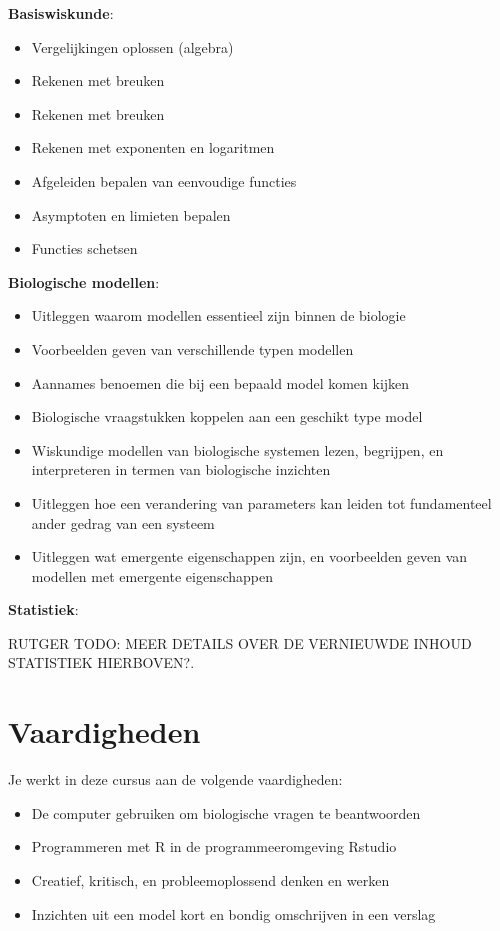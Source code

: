 \documentclass[
  a4paper,
]{scrbook}
\providecommand{\tightlist}{%
  \setlength{\itemsep}{0pt}\setlength{\parskip}{0pt}}\usepackage{longtable,booktabs,array}
\theoremstyle{definition}
\theoremstyle{remark}
\begin{document}
\textbf{Basiswiskunde}:

\begin{itemize}
\tightlist
\item
  Vergelijkingen oplossen (algebra)
\item
  Rekenen met breuken
\item
  Rekenen met breuken
\item
  Rekenen met exponenten en logaritmen
\item
  Afgeleiden bepalen van eenvoudige functies
\item
  Asymptoten en limieten bepalen
\item
  Functies schetsen
\end{itemize}

\textbf{Biologische modellen}:

\begin{itemize}
\tightlist
\item
  Uitleggen waarom modellen essentieel zijn binnen de biologie
\item
  Voorbeelden geven van verschillende typen modellen
\item
  Aannames benoemen die bij een bepaald model komen kijken
\item
  Biologische vraagstukken koppelen aan een geschikt type model
\item
  Wiskundige modellen van biologische systemen lezen, begrijpen, en
  interpreteren in termen van biologische inzichten
\item
  Uitleggen hoe een verandering van parameters kan leiden tot
  fundamenteel ander gedrag van een systeem
\item
  Uitleggen wat emergente eigenschappen zijn, en voorbeelden geven van
  modellen met emergente eigenschappen
\end{itemize}

\textbf{Statistiek}:

RUTGER TODO: MEER DETAILS OVER DE VERNIEUWDE INHOUD STATISTIEK
HIERBOVEN?.

\section{Vaardigheden}\label{vaardigheden}

Je werkt in deze cursus aan de volgende vaardigheden:

\begin{itemize}
\tightlist
\item
  De computer gebruiken om biologische vragen te beantwoorden
\item
  Programmeren met R in de programmeeromgeving Rstudio
\item
  Creatief, kritisch, en probleemoplossend denken en werken
\item
  Inzichten uit een model kort en bondig omschrijven in een verslag
\end{itemize}
\end{document}
